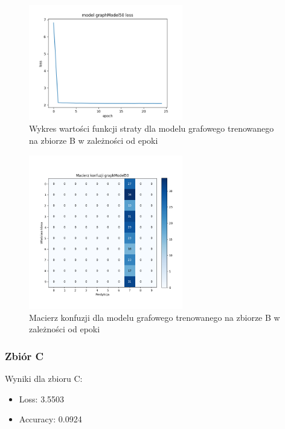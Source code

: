 \documentclass{article}
\begin{document}
\begin{figure}[H]
    \centering
    \includegraphics[width=0.6\textwidth]{../Saves/Graph/graphModel50_loss.png}
    \caption{Wykres wartości funkcji straty dla modelu grafowego trenowanego na zbiorze B w zależności od epoki} 
\end{figure}

\begin{figure}[H]
    \centering
    \includegraphics[width=0.6\textwidth]{../Saves/Graph/graphModel50_confusion.png}
    \caption{Macierz konfuzji dla modelu grafowego trenowanego na zbiorze B w zależności od epoki} 
\end{figure}

\subsubsection{Zbiór C}

Wyniki dla zbioru C:
\begin{itemize}
    \item Loss: 3.5503
    \item Accuracy: 0.0924
\end{itemize}
\end{document}
